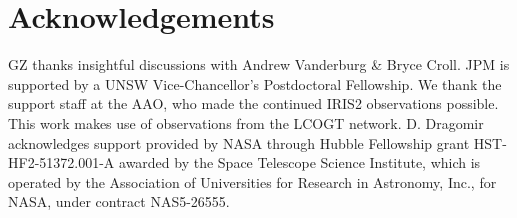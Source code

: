 \documentclass[useAMS,usenatbib]{mn2e}
\begin{document}
\section*{Acknowledgements}
\label{sec:acknowledgements}
GZ thanks insightful discussions with Andrew Vanderburg \& Bryce Croll. JPM is supported by a UNSW Vice-Chancellor's Postdoctoral Fellowship. We thank the support staff at the AAO, who made the continued IRIS2 observations possible. This work makes use of observations from the LCOGT network. D. Dragomir acknowledges support provided  by NASA through Hubble Fellowship grant HST-HF2-51372.001-A awarded by the Space Telescope Science Institute, which is operated by the Association of Universities for Research in Astronomy, Inc., for NASA, under contract NAS5-26555.





\label{lastpage}
\end{document}
